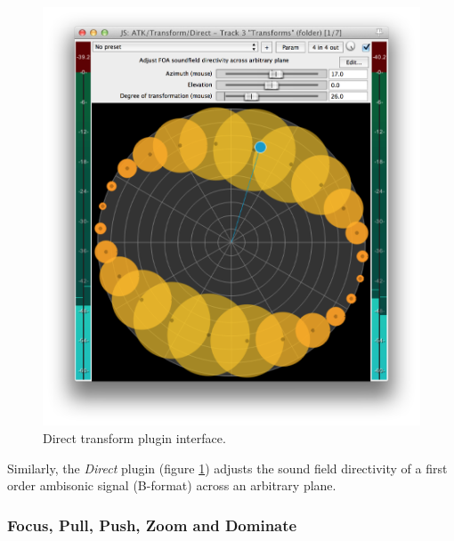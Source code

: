 \documentclass{article}
\begin{document}
\begin{figure}[h]
\captionsetup{aboveskip=-6pt}
\centering
\includegraphics[width=0.9\columnwidth]{figures/directTransform.png}
\caption{Direct transform plugin interface.\label{fig:directTransform}}
\end{figure}

Similarly, the \emph{Direct} plugin (figure \ref{fig:directTransform}) adjusts the sound field directivity of a first order ambisonic signal (B-format) across an arbitrary plane.


 
\subsubsection{Focus, Pull, Push, Zoom and Dominate}\label{sec:focus}
\end{document}
